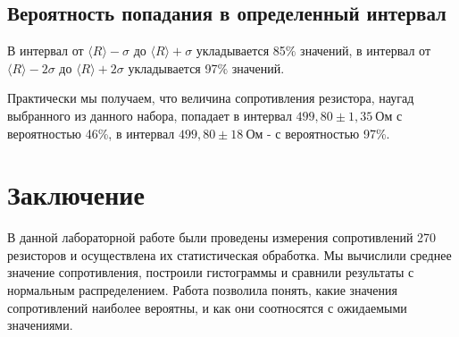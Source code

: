 \documentclass[a4paper, 12pt]{article}
\begin{document}
\subsection*{Вероятность попадания в определенный интервал}

В интервал от $\langle R\rangle - \sigma$ до $\langle R\rangle + \sigma$ укладывается 85$\%$ значений, в интервал от $\langle R\rangle - 2\sigma$ до $\langle R\rangle + 2\sigma$ укладывается 97$\%$ значений.

Практически мы получаем, что величина сопротивления резистора, наугад выбранного из данного набора, попадает в интервал $499,80 \pm 1,35 \:Ом$ с вероятностью 46\%, в интервал $499,80 \pm 18\: Ом$ - с вероятностью 97\%.

\section{Заключение}

В данной лабораторной работе были проведены измерения сопротивлений 270 резисторов и осуществлена их статистическая обработка. Мы вычислили среднее значение сопротивления, построили гистограммы и сравнили результаты с нормальным распределением. Работа позволила понять, какие значения сопротивлений наиболее вероятны, и как они соотносятся с ожидаемыми значениями.
\end{document}
